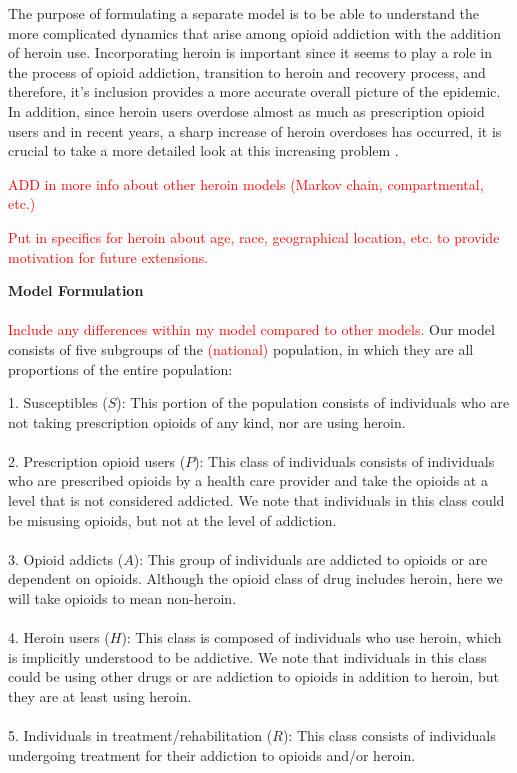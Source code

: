\documentclass[12pt]{article}
\begin{document}
The purpose of formulating a separate model is to be able to understand the more complicated dynamics that arise among opioid addiction with the addition of heroin use. Incorporating heroin is important since it seems to play a role in the process of opioid  addiction, transition to heroin and recovery process, and therefore, it's inclusion provides a more accurate overall picture of the epidemic. In addition, since heroin users overdose almost as much as prescription opioid users and in recent years, a sharp increase of heroin overdoses has occurred, it is crucial to take a more detailed look at this increasing problem \cite{CDC4}. 

\textcolor{red}{ADD in more info about other heroin models (Markov chain, compartmental, etc.)}

\textcolor{red}{Put in specifics for heroin about age, race, geographical location, etc. to provide motivation for future extensions.} 

\textbf{Model Formulation} \\ \\
\textcolor{red}{Include any differences within my model compared to other models.}
Our model consists of five subgroups of the \textcolor{red}{(national)} population, in which they are all proportions of the entire population: 

1. Susceptibles ($S$): This portion of the population consists of individuals who are not taking prescription opioids of any kind, nor are using heroin. \\ \\
2. Prescription opioid users ($P$): This class of individuals consists of individuals who are prescribed opioids by a health care provider and take the opioids at a level that is not considered addicted. We note that individuals in this class could be misusing opioids, but not at the level of addiction.  \\ \\
3. Opioid addicts ($A$): This group of individuals are addicted to opioids or are dependent on opioids. Although the opioid class of drug includes heroin, here we will take opioids to mean non-heroin. \\ \\
4. Heroin users ($H$): This class is composed of individuals who use heroin, which is implicitly understood to be addictive. We note that individuals in this class could be using other drugs or are addiction to opioids in addition to heroin, but they are at least using heroin. \\ \\
5. Individuals in treatment/rehabilitation ($R$): This class consists of individuals undergoing treatment for their addiction to opioids and/or heroin. 
\end{document}
